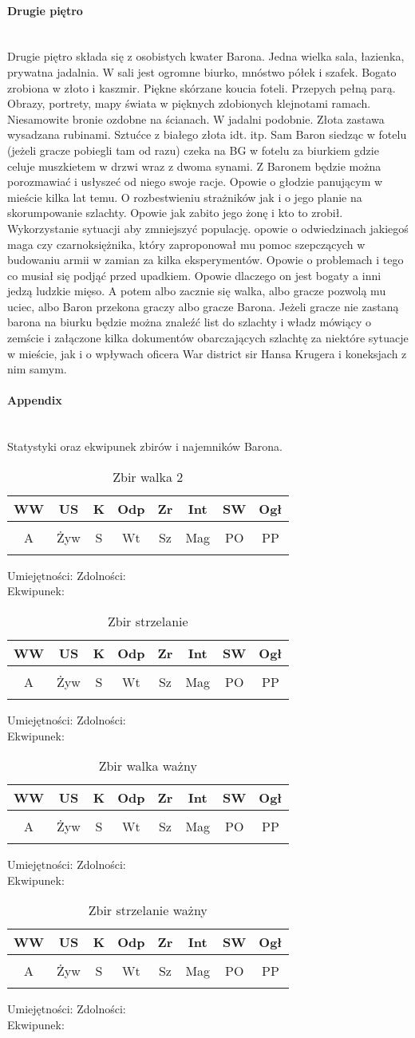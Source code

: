 \documentclass{article}
\newcommand{\whtable}[1]{
    \begin{table}[H]
        \caption{{#1}}
        \vspace{4pt}
        \centering
            \begin{tabular}{|c|c|c|c|c|c|c|c|}
                \hline
                WW & US & K & Odp & Zr & Int & SW & Ogł \\ \hline
                 &  &  &  &  &  &  &  \\ \hline
                A & Żyw & S & Wt & Sz & Mag & PO & PP \\ \hline
                 &  &  &  &  &  &  &  \\ \hline
                \end{tabular}
    \end{table}

    \noindent
    Umiejętności:
    \hspace{150pt}
    Zdolności:
    \vspace{50pt}\\
    Ekwipunek:
    \vspace{50pt}
}
\begin{document}
\paragraph{\Large{Drugie piętro}}\mbox{}\\

Drugie piętro składa się z osobistych kwater Barona. Jedna wielka sala, łazienka, prywatna jadalnia. W sali jest ogromne biurko, mnóstwo półek i szafek. Bogato zrobiona w złoto i kaszmir. Piękne skórzane koucia foteli. Przepych pełną parą. Obrazy, portrety, mapy świata w pięknych zdobionych klejnotami ramach. Niesamowite bronie ozdobne na ścianach. W jadalni podobnie. Złota zastawa wysadzana rubinami. Sztućce z białego złota idt. itp. Sam Baron siedząc w fotelu (jeżeli gracze pobiegli tam od razu) czeka na BG w fotelu za biurkiem gdzie celuje muszkietem w drzwi wraz z dwoma synami. Z Baronem będzie można porozmawiać i usłyszeć od niego swoje racje. Opowie o głodzie panującym w mieście kilka lat temu. O rozbestwieniu strażników jak i o jego planie na skorumpowanie szlachty. Opowie jak zabito jego żonę i kto to zrobił. Wykorzystanie sytuacji aby zmniejszyć populację. opowie o odwiedzinach jakiegoś maga czy czarnoksiężnika, który zaproponował mu pomoc szepczących w budowaniu armii w zamian za kilka eksperymentów. Opowie o problemach i tego co musiał się podjąć przed upadkiem. Opowie dlaczego on jest bogaty a inni jedzą ludzkie mięso. A potem albo zacznie się walka, albo gracze pozwolą mu uciec, albo Baron przekona graczy albo gracze Barona. Jeżeli gracze nie zastaną barona na biurku będzie można znaleźć list do szlachty i władz mówiący o zemście i załączone kilka dokumentów obarczających szlachtę za niektóre sytuacje w mieście, jak i o wpływach oficera War district sir Hansa Krugera i koneksjach z nim samym.



\pagebreak
\centering
\paragraph{\Large{Appendix}}\mbox{}\\
Statystyki oraz ekwipunek zbirów i najemników Barona.
\raggedright

\whtable{Zbir walka 2}

\whtable{Zbir strzelanie}

\whtable{Zbir walka ważny}

\whtable{Zbir strzelanie ważny}
\end{document}
